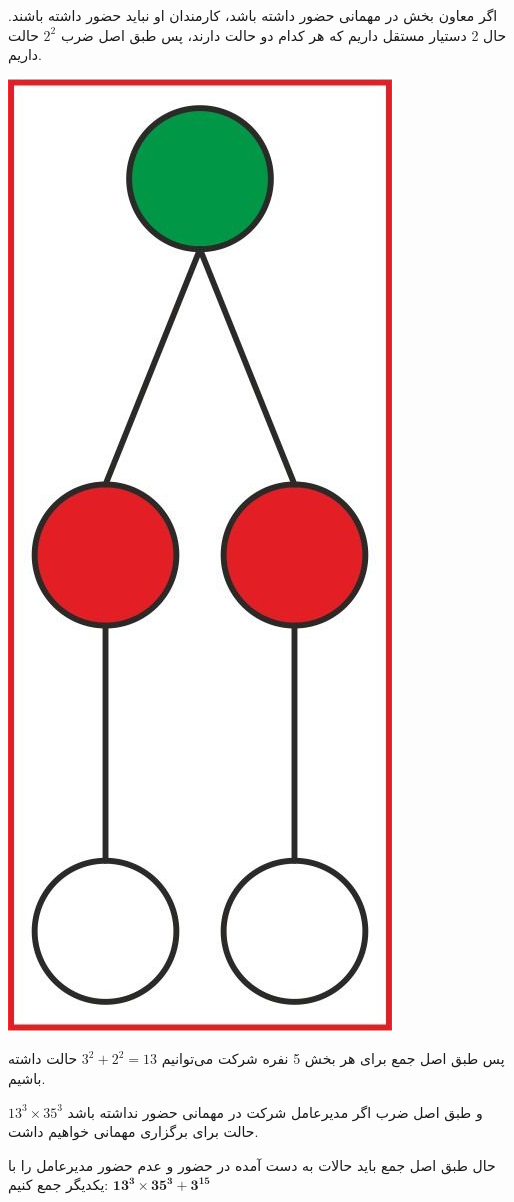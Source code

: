     اگر معاون بخش در مهمانی حضور داشته باشد، کارمندان او نباید حضور داشته باشند. حال 2 دستیار مستقل داریم که هر کدام دو حالت دارند، پس طبق اصل ضرب $2^2$ حالت داریم.
    \begin{center}
    	\includegraphics[scale=0.1]{7.jpg}
    \end{center}
    
    پس طبق اصل جمع برای هر بخش 5 نفره شرکت می‌توانیم $ 3^2 + 2^2 = 13 $ حالت داشته باشیم.
    
    و طبق اصل ضرب اگر مدیرعامل شرکت در مهمانی حضور نداشته باشد $ 13^3 \times  35 ^ 3 $ حالت برای برگزاری مهمانی خواهیم داشت.
    
    حال طبق اصل جمع باید حالات به دست آمده در حضور و عدم حضور مدیرعامل را با یکدیگر جمع کنیم:   
    $\mathbf{ 13^3 \times  35 ^ 3  + 3^{15} }$
